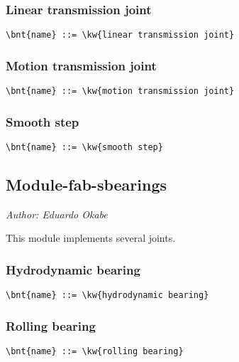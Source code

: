 \subsubsection{Linear transmission joint}
\begin{Verbatim}[commandchars=\\\{\}]
    \bnt{name} ::= \kw{linear transmission joint}
\end{Verbatim}

\subsubsection{Motion transmission joint}
\begin{Verbatim}[commandchars=\\\{\}]
    \bnt{name} ::= \kw{motion transmission joint}
\end{Verbatim}

\subsubsection{Smooth step}
\begin{Verbatim}[commandchars=\\\{\}]
    \bnt{name} ::= \kw{smooth step}
\end{Verbatim}



\subsection{Module-fab-sbearings}
\emph{Author: Eduardo Okabe}

\noindent
This module implements several joints.

\subsubsection{Hydrodynamic bearing}
\begin{Verbatim}[commandchars=\\\{\}]
    \bnt{name} ::= \kw{hydrodynamic bearing}
\end{Verbatim}

\subsubsection{Rolling bearing}
\begin{Verbatim}[commandchars=\\\{\}]
    \bnt{name} ::= \kw{rolling bearing}
\end{Verbatim}



